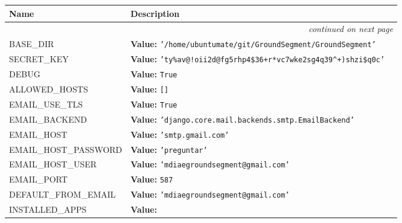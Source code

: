     \vspace{-1cm}
\hspace{\varindent}\begin{longtable}{|p{\varnamewidth}|p{\vardescrwidth}|l}
\cline{1-2}
\cline{1-2} \centering \textbf{Name} & \centering \textbf{Description}& \\
\cline{1-2}
\endhead\cline{1-2}\multicolumn{3}{r}{\small\textit{continued on next page}}\\\endfoot\cline{1-2}
\endlastfoot\raggedright B\-A\-S\-E\-\_\-D\-I\-R\- & \raggedright \textbf{Value:} 
{\tt \texttt{'}\texttt{/home/ubuntumate/git/GroundSegment/GroundSegment}\texttt{'}}&\\
\cline{1-2}
\raggedright S\-E\-C\-R\-E\-T\-\_\-K\-E\-Y\- & \raggedright \textbf{Value:} 
{\tt \texttt{'}\texttt{ty\%av@!oii2d@fg5rhp4\$36+r*vc7wke2sg4q39{\textasciicircum}+)shzi\$q0c}\texttt{'}}&\\
\cline{1-2}
\raggedright D\-E\-B\-U\-G\- & \raggedright \textbf{Value:} 
{\tt True}&\\
\cline{1-2}
\raggedright A\-L\-L\-O\-W\-E\-D\-\_\-H\-O\-S\-T\-S\- & \raggedright \textbf{Value:} 
{\tt \texttt{[}\texttt{]}}&\\
\cline{1-2}
\raggedright E\-M\-A\-I\-L\-\_\-U\-S\-E\-\_\-T\-L\-S\- & \raggedright \textbf{Value:} 
{\tt True}&\\
\cline{1-2}
\raggedright E\-M\-A\-I\-L\-\_\-B\-A\-C\-K\-E\-N\-D\- & \raggedright \textbf{Value:} 
{\tt \texttt{'}\texttt{django.core.mail.backends.smtp.EmailBackend}\texttt{'}}&\\
\cline{1-2}
\raggedright E\-M\-A\-I\-L\-\_\-H\-O\-S\-T\- & \raggedright \textbf{Value:} 
{\tt \texttt{'}\texttt{smtp.gmail.com}\texttt{'}}&\\
\cline{1-2}
\raggedright E\-M\-A\-I\-L\-\_\-H\-O\-S\-T\-\_\-P\-A\-S\-S\-W\-O\-R\-D\- & \raggedright \textbf{Value:} 
{\tt \texttt{'}\texttt{preguntar}\texttt{'}}&\\
\cline{1-2}
\raggedright E\-M\-A\-I\-L\-\_\-H\-O\-S\-T\-\_\-U\-S\-E\-R\- & \raggedright \textbf{Value:} 
{\tt \texttt{'}\texttt{mdiaegroundsegment@gmail.com}\texttt{'}}&\\
\cline{1-2}
\raggedright E\-M\-A\-I\-L\-\_\-P\-O\-R\-T\- & \raggedright \textbf{Value:} 
{\tt 587}&\\
\cline{1-2}
\raggedright D\-E\-F\-A\-U\-L\-T\-\_\-F\-R\-O\-M\-\_\-E\-M\-A\-I\-L\- & \raggedright \textbf{Value:} 
{\tt \texttt{'}\texttt{mdiaegroundsegment@gmail.com}\texttt{'}}&\\
\cline{1-2}
\raggedright I\-N\-S\-T\-A\-L\-L\-E\-D\-\_\-A\-P\-P\-S\- & \raggedright \textbf{Value:} 

\end{longtable}
